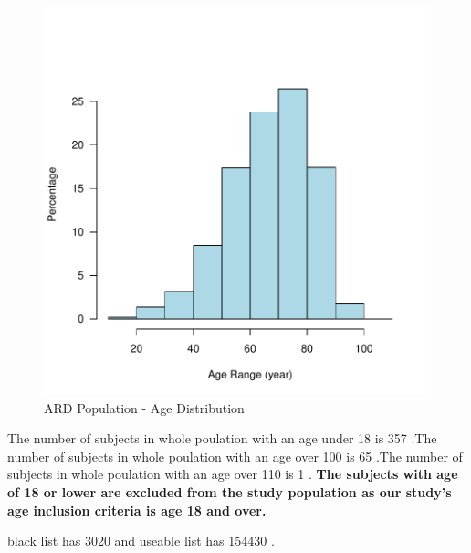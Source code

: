 \documentclass{article}
\begin{document}
\begin{figure}
\includegraphics{Fig-fig1}

\caption{ARD Population - Age Distribution}

\end{figure}
\newpage

The number of subjects in whole poulation with an age under 18 is 357 .The number of subjects in whole poulation with an age over 100 is 65 .The number of subjects in whole poulation with an age over 110 is 1 .
\textbf{The subjects with age of 18 or lower are excluded from the study population as our study's age inclusion criteria is age 18 and over.}

black list has 3020 and useable list has 154430 .
\end{document}
